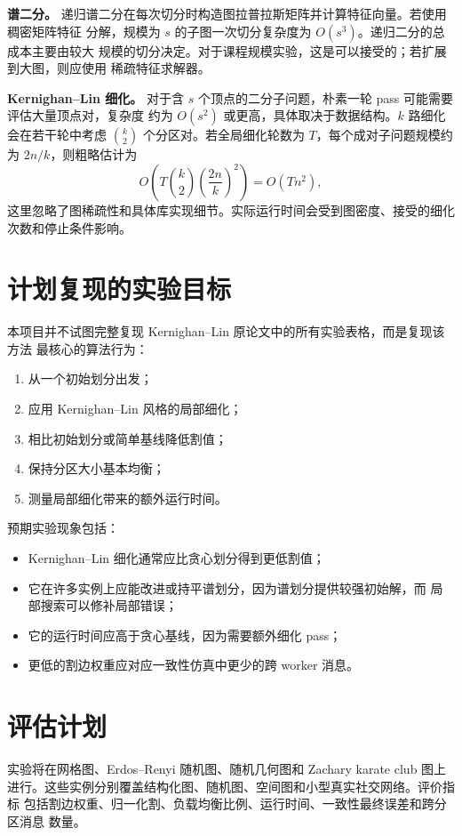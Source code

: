\documentclass[UTF8, 11pt]{ctexart}
\begin{document}
\textbf{谱二分。}
递归谱二分在每次切分时构造图拉普拉斯矩阵并计算特征向量。若使用稠密矩阵特征
分解，规模为 $s$ 的子图一次切分复杂度为 $O(s^3)$。递归二分的总成本主要由较大
规模的切分决定。对于课程规模实验，这是可以接受的；若扩展到大图，则应使用
稀疏特征求解器。

\textbf{Kernighan--Lin 细化。}
对于含 $s$ 个顶点的二分子问题，朴素一轮 pass 可能需要评估大量顶点对，复杂度
约为 $O(s^2)$ 或更高，具体取决于数据结构。$k$ 路细化会在若干轮中考虑
$\binom{k}{2}$ 个分区对。若全局细化轮数为 $T$，每个成对子问题规模约为
$2n/k$，则粗略估计为
\[
    O\left(T \binom{k}{2}\left(\frac{2n}{k}\right)^2\right)
    =
    O(Tn^2),
\]
这里忽略了图稀疏性和具体库实现细节。实际运行时间会受到图密度、接受的细化
次数和停止条件影响。

\section{计划复现的实验目标}

本项目并不试图完整复现 Kernighan--Lin 原论文中的所有实验表格，而是复现该方法
最核心的算法行为：
\begin{enumerate}
    \item 从一个初始划分出发；
    \item 应用 Kernighan--Lin 风格的局部细化；
    \item 相比初始划分或简单基线降低割值；
    \item 保持分区大小基本均衡；
    \item 测量局部细化带来的额外运行时间。
\end{enumerate}

预期实验现象包括：
\begin{itemize}
    \item Kernighan--Lin 细化通常应比贪心划分得到更低割值；
    \item 它在许多实例上应能改进或持平谱划分，因为谱划分提供较强初始解，而
    局部搜索可以修补局部错误；
    \item 它的运行时间应高于贪心基线，因为需要额外细化 pass；
    \item 更低的割边权重应对应一致性仿真中更少的跨 worker 消息。
\end{itemize}

\section{评估计划}

实验将在网格图、Erdos--Renyi 随机图、随机几何图和 Zachary karate club 图上
进行。这些实例分别覆盖结构化图、随机图、空间图和小型真实社交网络。评价指标
包括割边权重、归一化割、负载均衡比例、运行时间、一致性最终误差和跨分区消息
数量。
\end{document}
